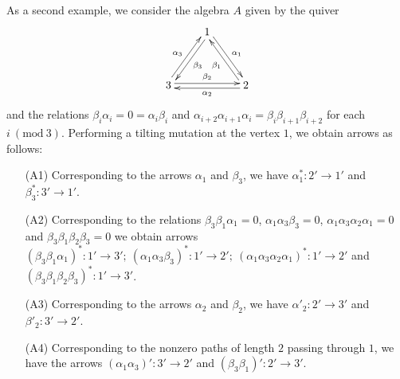 \documentclass{amsart}
\begin{document}
\vspace{5mm}
As a second example, we consider the algebra $A$ given by the quiver
$$\xymatrixrowsep{3pc} \xymatrix{ & 1 \ar[dr]<.5ex>^{\alpha_1} \ar[dl]<.5ex>^{\beta_3} \\ 3 \ar[rr]<.5ex>^{\beta_2} \ar[ur]<.5ex>^{\alpha_3} & & 2 \ar[ll]<.5ex>^{\alpha_2} \ar[ul]<.5ex>^{\beta_1}}$$
and the relations $ \beta_i \alpha_i = 0 = \alpha_i \beta_i$ and $\alpha_{i+2}\alpha_{i+1}\alpha_i = \beta_i \beta_{i+1} \beta_{i+2}$ for each $i\  (\mbox{mod}\ 3)$.
Performing a tilting mutation at the vertex $1$, we obtain  arrows as follows:
\begin{itemize}
\item[(A1)] Corresponding to the arrows $\alpha_1$ and $\beta_3$, we have $\alpha_1^* : 2' \rightarrow 1'$ and $\beta_3^* : 3' \rightarrow 1'$.
\item[(A2)] Corresponding to the relations $\beta_3 \beta_1 \alpha_1 = 0$, $\alpha_1 \alpha_3 \beta_3 = 0$, $\alpha_1 \alpha_3 \alpha_2 \alpha_1 = 0$ and $\beta_3 \beta_1 \beta_2 \beta_3 = 0$ we obtain arrows $(\beta_3 \beta_1 \alpha_1)^*: 1' \rightarrow 3' ;\  (\alpha_1 \alpha_3 \beta_3)^*: 1' \rightarrow 2'; \ (\alpha_1 \alpha_3 \alpha_2 \alpha_1)^* : 1' \rightarrow 2'$ and $(\beta_3 \beta_1 \beta_2 \beta_3)^* : 1' \rightarrow 3'$.
\item[(A3)] Corresponding to the arrows $\alpha_2$ and $\beta_2$, we have $\alpha'_2 : 2' \rightarrow 3'$ and $\beta'_2 : 3' \rightarrow 2'$.
\item[(A4)] Corresponding to the nonzero paths of length $2$ passing through $1$, we have the arrows $(\alpha_1 \alpha_3)' : 3' \rightarrow 2'$ and $(\beta_3 \beta_1)' : 2' \rightarrow 3'$.
\end{itemize}
\end{document}
